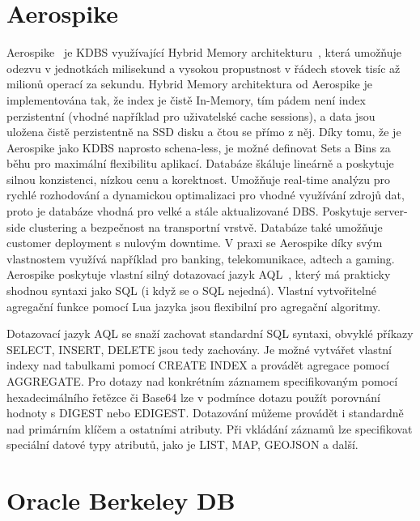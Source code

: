 \documentclass[czech,master,dept460,male,csharp,cpdeclaration]{diploma}
\begin{document}
	\section{Aerospike} \label{lab-aerospike}
	
	Aerospike~\cite{aerospike} je KDBS využívající Hybrid Memory architekturu~\cite{hybmem-arch}, která umožňuje odezvu v jednotkách milisekund a vysokou propustnost v řádech stovek tisíc až milionů operací za sekundu. Hybrid Memory architektura od Aerospike je implementována tak, že index je čistě In-Memory, tím pádem není index perzistentní (vhodné například pro uživatelské cache sessions), a data jsou uložena čistě perzistentně na SSD disku a čtou se přímo z něj. Díky tomu, že je Aerospike jako KDBS naprosto schena-less, je možné definovat Sets a Bins za běhu pro maximální flexibilitu aplikací. Databáze škáluje lineárně a poskytuje silnou konzistenci, nízkou cenu a korektnost. Umožňuje real-time analýzu pro rychlé rozhodování a dynamickou optimalizaci pro vhodné využívání zdrojů dat, proto je databáze vhodná pro velké a stále aktualizované DBS. Poskytuje server-side clustering a bezpečnost na transportní vrstvě. Databáze také umožňuje customer deployment s nulovým downtime. V praxi se Aerospike díky svým vlastnostem využívá například pro banking, telekomunikace, adtech a gaming. Aerospike poskytuje vlastní silný dotazovací jazyk AQL~\cite{aql}, který má prakticky shodnou syntaxi jako SQL (i když se o SQL nejedná). Vlastní vytvořitelné agregační funkce pomocí Lua jazyka jsou flexibilní pro agregační algoritmy.
	
	Dotazovací jazyk AQL se snaží zachovat standardní SQL syntaxi, obvyklé příkazy SELECT, INSERT, DELETE jsou tedy zachovány. Je možné vytvářet vlastní indexy nad tabulkami pomocí CREATE INDEX a provádět agregace pomocí AGGREGATE. Pro dotazy nad konkrétním záznamem specifikovaným pomocí hexadecimálního řetězce či Base64 lze v podmínce dotazu použít porovnání hodnoty s DIGEST nebo EDIGEST. Dotazování můžeme provádět i standardně nad primárním klíčem a ostatními atributy. Při vkládání záznamů lze specifikovat speciální datové typy atributů, jako je LIST, MAP, GEOJSON a další.
	
	\section{Oracle Berkeley DB}
	
\end{document}
